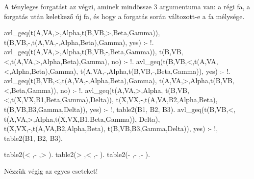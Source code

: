 A tényleges forgatást az  végzi, aminek
mindössze 3 argumentuma van: a régi fa, a forgatás
után keletkező új fa, és hogy a forgatás során
változott-e a fa mélysége.

\begin{program*}
avl_geq(t(A,VA,>,Alpha,t(B,VB,>,Beta,Gamma)),
        t(B,VB,-,t(A,VA,-,Alpha,Beta),Gamma),
        yes) :- !.
avl_geq(t(A,VA,>,Alpha,t(B,VB,-,Beta,Gamma)),
        t(B,VB,<,t(A,VA,>,Alpha,Beta),Gamma),
        no) :- !.
avl_geq(t(B,VB,<,t(A,VA,<,Alpha,Beta),Gamma),
        t(A,VA,-,Alpha,t(B,VB,-,Beta,Gamma)),
        yes) :- !.
avl_geq(t(B,VB,<,t(A,VA,-,Alpha,Beta),Gamma),
        t(A,VA,>,Alpha,t(B,VB,<,Beta,Gamma)),
        no) :- !.
avl_geq(t(A,VA,>,Alpha,
            t(B,VB,<,t(X,VX,B1,Beta,Gamma),Delta)),
        t(X,VX,-,t(A,VA,B2,Alpha,Beta),
            t(B,VB,B3,Gamma,Delta)),
        yes) :-
    !,
    table2(B1, B2, B3).
avl_geq(t(B,VB,<,
            t(A,VA,>,Alpha,t(X,VX,B1,Beta,Gamma)),
            Delta),
        t(X,VX,-,t(A,VA,B2,Alpha,Beta),
            t(B,VB,B3,Gamma,Delta)),
        yes) :-
    !,
    table2(B1, B2, B3).

table2(< ,- ,> ).
table2(> ,< ,- ).
table2(- ,- ,- ).
\end{program*}
Nézzük végig az egyes eseteket!
